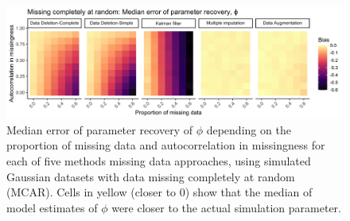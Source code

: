 \documentclass{article}
\begin{document}
\begin{figure}
    \noindent\includegraphics[width = \textwidth]{Figures/MockedUpFigures/heatmap_GaussianMCAR_justPhi.png}
    \caption{Median error of parameter recovery of $\phi$ depending on the proportion of missing data and autocorrelation in missingness for each of five methods missing data approaches, using simulated Gaussian datasets with data missing completely at random (MCAR). Cells in yellow (closer to 0) show that the median of model estimates of $\phi$  were closer to the actual simulation parameter.}
    \label{fig:heatMap_gauss_MAR}
\end{figure}
\end{document}
